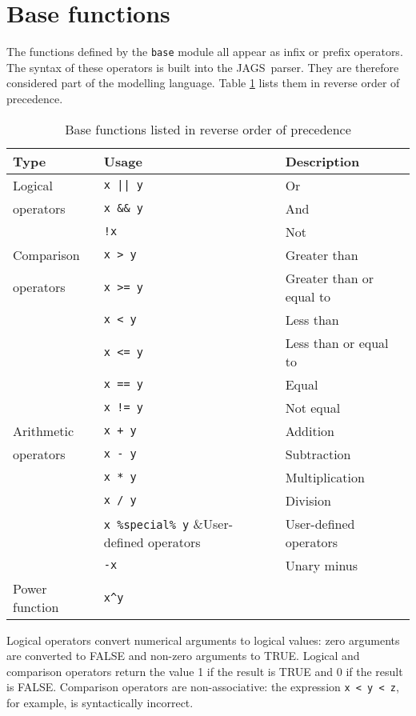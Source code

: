 \documentclass[11pt, a4paper, titlepage]{report}
\newcommand{\JAGS}{\textsf{JAGS}}
\begin{document}
\section{Base functions}
\label{section:functions:base}

The functions defined by the \verb+base+ module all appear as infix or
prefix operators. The syntax of these operators is built into the
\JAGS\ parser. They are therefore considered part of the modelling
language.  Table \ref{table:base:functions} lists them in reverse
order of precedence.

\begin{table}[h]
\begin{center}
\begin{tabular}{lll}
\hline
Type & Usage & Description\\ 
\hline
Logical           & \verb+x || y+ & Or \\
operators         & \verb+x && y+ & And \\
                  & \verb+!x+     & Not \\
\hline
Comparison  & \verb+x > y+ & Greater than\\
operators   & \verb+x >= y+ & Greater than or equal to  \\
            & \verb+x < y+ & Less than \\
            & \verb+x <= y+ & Less than or equal to \\
            & \verb+x == y+ & Equal \\
            & \verb+x != y+ & Not equal \\
\hline
Arithmetic  & \verb-x + y- & Addition \\
operators   & \verb+x - y+ & Subtraction\\
            & \verb+x * y+ & Multiplication \\
            & \verb+x / y+ & Division \\
            & \verb+x %special% y+ &User-defined operators\\
            & \verb+-x+ & Unary minus\\
\hline
Power function & \verb+x^y+ & \\
\hline
\end{tabular}
\caption{Base functions listed in reverse order of precedence 
  \label{table:base:functions}}
\end{center}
\end{table}

Logical operators convert numerical arguments to logical values: zero
arguments are converted to FALSE and non-zero arguments to
TRUE. Logical and comparison operators return the value 1 if the
result is TRUE and 0 if the result is FALSE.  Comparison operators are
non-associative: the expression \verb+x < y < z+, for example, is
syntactically incorrect.
\end{document}
